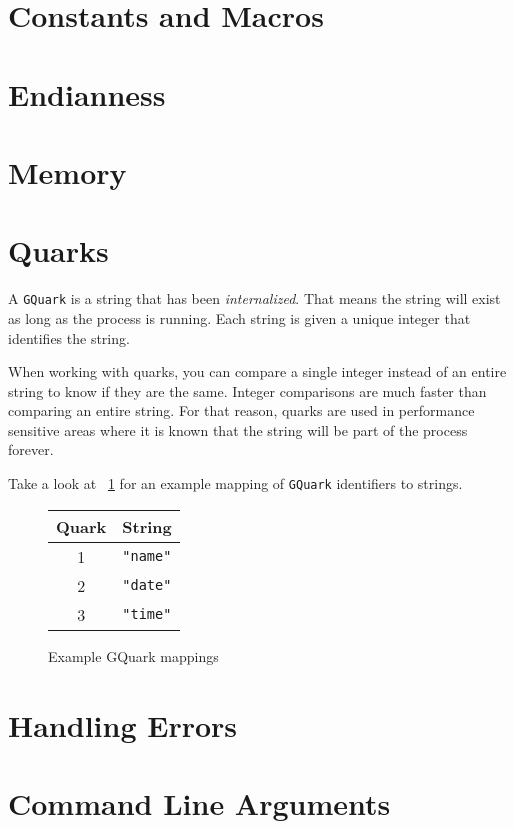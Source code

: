 \section{Constants and Macros}

\section{Endianness}

\section{Memory}

\section{Quarks}

A \verb|GQuark| is a string that has been \emph{internalized}.
That means the string will exist as long as the process is running.
Each string is given a unique integer that identifies the string.

When working with quarks, you can compare a single integer instead of an entire string to know if they are the same.
Integer comparisons are much faster than comparing an entire string.
For that reason, quarks are used in performance sensitive areas where it is known that the string will be part of the process forever.

Take a look at ~\ref{fig:quarks} for an example mapping of \verb|GQuark| identifiers to strings.

\begin{figure}[h!]
\centering
\begin{tabular}{c | l}
Quark & String \\
\hline
1 & \verb|"name"| \\
2 & \verb|"date"| \\
3 & \verb|"time"| \\
\end{tabular}
\caption{Example GQuark mappings}
\label{fig:quarks}
\end{figure}

\section{Handling Errors}

\section{Command Line Arguments}
